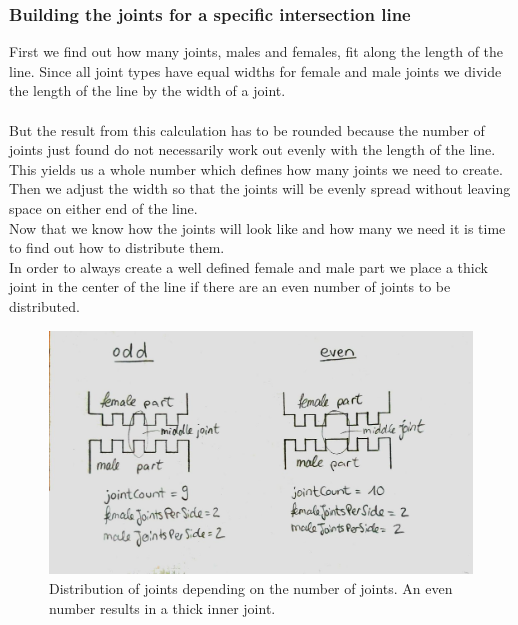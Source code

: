 \documentclass[../ClassicThesis.tex]{subfiles}
\begin{document}
\subsubsection*{Building the joints for a specific intersection line}
First we find out how many joints, males and females, fit along the length of the line.
Since all joint types have equal widths for female and male joints we divide the length of the line by the width of a joint.\\
\*\\
But the result from this calculation has to be rounded because the number of joints just found do not necessarily work out evenly with the length of the line. This yields us a whole number which defines how many joints we need to create. Then we adjust the width so that the joints will be evenly spread without leaving space on either end of the line.\\
Now that we know how the joints will look like and how many we need it is time to find out how to distribute them.\\
In order to always create a well defined female and male part we place a thick joint in the center of the line if there are an even number of joints to be distributed.\\
\begin{figure}[!ht]
\centering
\includegraphics[width=\columnwidth]{Images/10-joints-evenOddJointCount.jpg}
\caption{Distribution of joints depending on the number of joints. An even number results in a thick inner joint.}
\end{figure}
\end{document}
